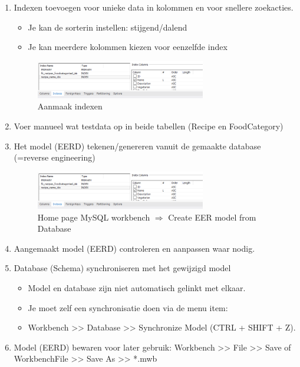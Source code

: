 \documentclass{article}
\begin{document}
\begin{enumerate}
    \item Indexen toevoegen voor unieke data in kolommen en voor snellere zoekacties.
    \begin{itemize}
        \item Je kan de sorterin instellen: stijgend/dalend
        \item Je kan meerdere kolommen kiezen voor eenzelfde index
    \end{itemize}
    \begin{figure}[H]
        \centering
        \includegraphics[width=0.7\textwidth]{stappenplan-3.png}
        \caption{Aanmaak indexen}
    \end{figure}

    \item Voer manueel wat testdata op in beide tabellen (Recipe en FoodCategory)
    \item Het model (EERD) tekenen/genereren vanuit de gemaakte database (=reverse engineering)

    \begin{figure}[H]
        \centering
        \includegraphics[width=0.7\textwidth]{stappenplan-3.png}
        \caption{Home page MySQL workbench $\Rightarrow$ Create EER model from Database}
    \end{figure}

    \item Aangemaakt model (EERD) controleren en aanpassen waar nodig.
    \item Database (Schema) synchroniseren met het gewijzigd model
    \begin{itemize}
        \item Model en database zijn niet automatisch gelinkt met elkaar.
        \item Je moet zelf een synchronisatie doen via de menu item:
        \item Workbench >> Database >> Synchronize Model (CTRL + SHIFT + Z).
    \end{itemize}
    \item Model (EERD) bewaren voor later gebruik: Workbench >> File >> Save of WorkbenchFile >> Save As >> *.mwb
\end{enumerate}
\end{document}
